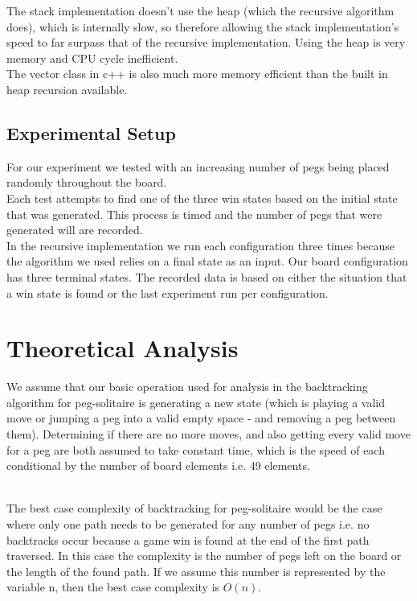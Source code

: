 \documentclass[a4paper]{article}
\begin{document}
\noindent The stack implementation doesn't use the heap (which the recursive algorithm does), which is internally slow, so therefore allowing the stack implementation's speed to far surpass that of the recursive implementation. Using the heap is very memory and CPU cycle inefficient.\\

\noindent The vector class in c++ is also much more memory efficient than the built in heap recursion available.

\subsection{Experimental Setup}
For our experiment we tested with an increasing number of pegs being placed randomly throughout the board.\\

\noindent Each test attempts to find one of the three win states based on the initial state that was generated. This process is timed and the number of pegs that were generated will are recorded.\\

\noindent In the recursive implementation we run each configuration three times because the algorithm we used relies on a final state as an input. Our board configuration has three terminal states. The recorded data is based on either the situation that a win state is found or the last experiment run per configuration.\\


\section{Theoretical Analysis}
We assume that our basic operation used for analysis in the backtracking algorithm for peg-solitaire is generating a new state (which is playing a valid move or jumping a peg into a valid empty space - and removing a peg between them). Determining if there are no more moves, and also getting every valid move for a peg are both assumed to take constant time, which is the speed of each conditional by the number of board elements i.e. 49 elements.\\\

\noindent The best case complexity of backtracking for peg-solitaire would be the case where only one path needs to be generated for any number of pegs i.e. no backtracks occur because a game win is found at the end of the first path traversed. In this case the complexity is the number of pegs left on the board or the length of the found path. If we assume this number is represented by the variable n, then the best case complexity is $O(n)$.\\\
\end{document}
